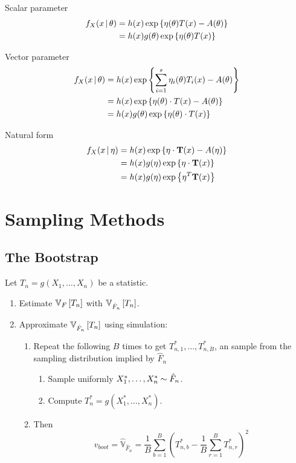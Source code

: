 \documentclass[landscape]{article}
\begin{document}
\begin{multicols*}{2}
Scalar parameter
\begin{align*}
f_X(x \giv \theta) 
&= h(x) \Exp{\eta(\theta)T(x) - A(\theta)} \\
&= h(x) g(\theta) \Exp{\eta(\theta)T(x)}
\end{align*}

Vector parameter
\begin{align*}
f_X(x \giv \theta) 
&= h(x) \Exp{\sum_{i=1}^s\eta_i(\theta)T_i(x) - A(\theta)} \\
&= h(x) \Exp{\eta(\theta)\cdot T(x) - A(\theta)} \\
&= h(x) g(\theta)\Exp{\eta(\theta)\cdot T(x)}
\end{align*}

Natural form
\begin{align*}
f_X(x \giv \eta) 
&= h(x) \Exp{\eta\cdot \mathbf{T}(x) - A(\eta)} \\
&= h(x) g(\eta) \Exp{\eta\cdot \mathbf{T}(x)} \\
&= h(x) g(\eta) \Exp{\eta^T \mathbf{T}(x)}
\end{align*}

\section{Sampling Methods}

\subsection{The Bootstrap}

Let $T_n = g(X_1,\dots,X_n)$ be a statistic.
\begin{enumerate}
  \item Estimate $\V[F]{T_n}$ with $\V[\hat{F}_n]{T_n}$.
  \item Approximate $\V[\hat{F}_n]{T_n}$ using simulation:
    \begin{enumerate}
      \item Repeat the following $B$ times to get $T_{n,1}^*,\dots,T_{n,B}^*$,
        an \iid sample from the sampling distribution implied by $\hat{F}_n$
        \begin{enumerate}
          \item Sample uniformly $X_1^*,\dots,X_n^* \dist \hat{F}_n$.
          \item Compute $T_n^* = g(X_1^*,\dots,X_n^*)$.
        \end{enumerate}
      \item Then 
        $$v_{boot} = \hat{\mathbb{V}}_{\hat{F}_n} = 
          \displaystyle\frac{1}{B} \sum_{b=1}^B
            \left( T_{n,b}^* - \frac{1}{B} \sum_{r=1}^B T_{n,r}^* \right)^2$$
    \end{enumerate}
\end{enumerate}


\end{multicols*}
\end{document}
